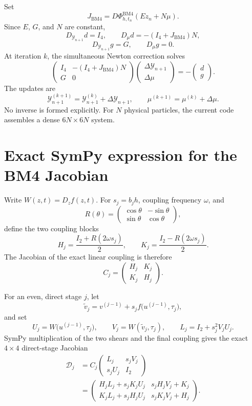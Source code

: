 \documentclass[11pt,a4paper]{article}
\newcommand{\Id}{I}
\newcommand{\Y}{\mathcal{Y}}
\newcommand{\PhiBM}{\Phi^{\mathrm{BM4}}_{h,t_n}}
\begin{document}
Set
\[
 J_{\mathrm{BM4}}
 =D\PhiBM(Ez_n+N\mu).
\]
Since $E$, $G$, and $N$ are constant,
\[
 D_{\Y_{n+1}}d=\Id_4,
 \qquad
 D_\mu d=-(\Id_4+J_{\mathrm{BM4}})N,
\]
\[
 D_{\Y_{n+1}}g=G,
 \qquad
 D_\mu g=0.
\]
At iteration $k$, the simultaneous Newton correction solves
\[
 \boxed{
 \begin{pmatrix}
  \Id_4&-(\Id_4+J_{\mathrm{BM4}})N\\[2pt]
  G&0
 \end{pmatrix}
 \begin{pmatrix}
  \Delta\Y_{n+1}\\
  \Delta\mu
 \end{pmatrix}
 =-
 \begin{pmatrix}
  d\\g
 \end{pmatrix}.
 } \tag{3}
\]
The updates are
\[
 \Y_{n+1}^{(k+1)}=\Y_{n+1}^{(k)}+\Delta\Y_{n+1},
 \qquad
 \mu^{(k+1)}=\mu^{(k)}+\Delta\mu.
\]
No inverse is formed explicitly.  For $N$ physical particles, the current code
assembles a dense $6N\times6N$ system.

\section{Exact SymPy expression for the BM4 Jacobian}

Write $W(z,t)=D_zf(z,t)$.  For $s_j=b_jh$, coupling frequency $\omega$,
and
\[
 R(\theta)=
 \begin{pmatrix}
  \cos\theta&-\sin\theta\\
  \sin\theta&\cos\theta
 \end{pmatrix},
\]
define the two coupling blocks
\[
 H_j=\frac{\Id_2+R(2\omega s_j)}{2},
 \qquad
 K_j=\frac{\Id_2-R(2\omega s_j)}{2}.
\]
The Jacobian of the exact linear coupling is therefore
\[
 C_j=
 \begin{pmatrix}
  H_j&K_j\\
  K_j&H_j
 \end{pmatrix}.
\]

For an even, direct stage $j$, let
\[
 \widetilde v_j
 =v^{(j-1)}+s_jf\bigl(u^{(j-1)},\tau_j\bigr),
\]
and set
\[
 U_j=W\bigl(u^{(j-1)},\tau_j\bigr),
 \qquad
 V_j=W(\widetilde v_j,\tau_j),
 \qquad
 L_j=\Id_2+s_j^2V_jU_j.
\]
SymPy multiplication of the two shears and the final coupling gives the exact
$4\times4$ direct-stage Jacobian
\[
 \boxed{
 \begin{aligned}
 \mathcal D_j
 &=C_j
 \begin{pmatrix}
  L_j&s_jV_j\\
  s_jU_j&\Id_2
 \end{pmatrix}\\[2mm]
 &=
 \begin{pmatrix}
  H_jL_j+s_jK_jU_j&s_jH_jV_j+K_j\\
  K_jL_j+s_jH_jU_j&s_jK_jV_j+H_j
 \end{pmatrix}.
 \end{aligned}
 }
\]
\end{document}
